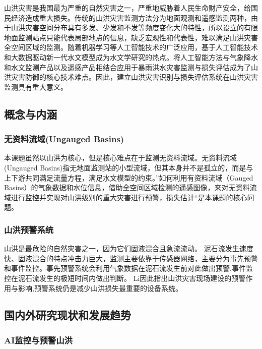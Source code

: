 \documentclass{ctexart}
\begin{document}
山洪灾害是我国最为严重的自然灾害之一，严重地威胁着人民生命财产安全，给国民经济造成重大损失。传统的山洪灾害监测方法分为地面观测和遥感监测两种，由于山洪灾害空间分布具有多发、少发和不发等频度变化大的特性，所以设立的有限地面监测站点只能代表局部地点的信息，缺乏宏观性和代表性，难以满足山洪灾害全空间区域的监测。随着机器学习等人工智能技术的广泛应用，基于人工智能技术和大数据驱动新一代水文模型成为水文学研究的热点。将人工智能方法与气象降水和水文监测产品以及遥感产品相结合应用于暴雨洪水灾害监测与损失评估成为了山洪灾害防御的核心技术难点。因此，建立山洪灾害识别与损失评估系统在山洪灾害监测具有重大意义。


\subsection{概念与内涵}

\subsubsection{无资料流域(Ungauged Basins)}

本课题虽然以山洪为核心，但是核心难点在于监测无资料流域。无资料流域(Ungauged Basins)指无地面监测站的小型流域，但其本身并不是孤立的，而是与上下游共同满足流量方程，满足水文模型的约束。”如何利用有资料流域（Gauged Basins）的气象数据和水位信息，借助全空间区域检测的遥感图像，来对无资料流域进行监控并实现对山洪级别的重大灾害进行预警，损失估计“是本课题的核心问题。

\subsubsection{山洪预警系统}

山洪\cite{koutalakis2020using}是最危险的自然灾害之一，因为它们固液混合且急流流动。
泥石流发生速度快、固液混合的特点冲击力巨大，监测主要依靠于传感器网络，主要分为事先预警和事件监控。事先预警系统会利用气象数据在泥石流发生前对此做出预警,事件监控在泥石流发生的极短时间内做出判断\cite{arattano2008systems}。
Li因此指出\cite{li2012flash}山洪灾害现场建设的预警作用与影响,预警系统仍是减少山洪损失最重要的设备系统。

\subsection{国内外研究现状和发展趋势}


\subsubsection{AI监控与预警山洪}
\end{document}
